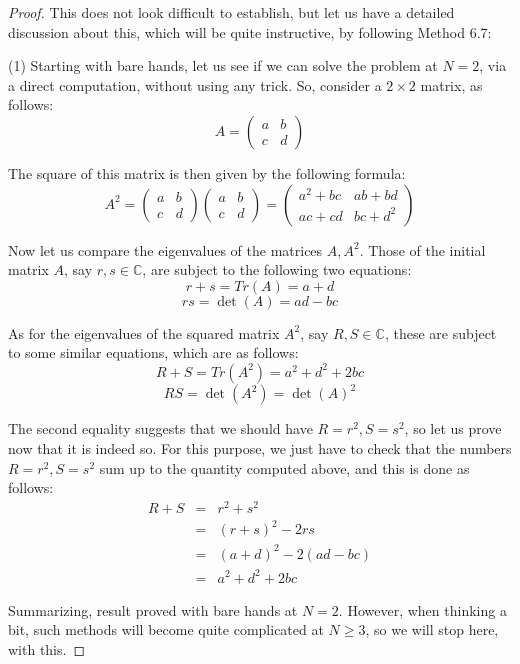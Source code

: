 \documentclass[10pt,a4paper]{amsart}
\begin{document}
\begin{proof}
This does not look difficult to establish, but let us have a detailed discussion about this, which will be quite instructive, by following Method 6.7: 

\medskip

(1) Starting with bare hands, let us see if we can solve the problem at $N=2$, via a direct computation, without using any trick. So, consider a $2\times2$ matrix, as follows:
$$A=\begin{pmatrix}
a&b\\ 
c&d
\end{pmatrix}$$

The square of this matrix is then given by the following formula:
$$A^2=\begin{pmatrix}
a&b\\ 
c&d
\end{pmatrix}\begin{pmatrix}
a&b\\ 
c&d
\end{pmatrix}
=\begin{pmatrix}
a^2+bc&ab+bd\\ 
ac+cd&bc+d^2
\end{pmatrix}$$

Now let us compare the eigenvalues of the matrices $A,A^2$. Those of the initial matrix $A$, say $r,s\in\mathbb C$, are subject to the following two equations:
$$r+s=Tr(A)=a+d$$
$$rs=\det(A)=ad-bc$$

As for the eigenvalues of the squared matrix $A^2$, say $R,S\in\mathbb C$, these are subject to some similar equations, which are as follows:
$$R+S=Tr(A^2)=a^2+d^2+2bc$$
$$RS=\det(A^2)=\det(A)^2$$

The second equality suggests that we should have $R=r^2,S=s^2$, so let us prove now that it is indeed so. For this purpose, we just have to check that the numbers $R=r^2,S=s^2$ sum up to the quantity computed above, and this is done as follows:
\begin{eqnarray*}
R+S
&=&r^2+s^2\\
&=&(r+s)^2-2rs\\
&=&(a+d)^2-2(ad-bc)\\
&=&a^2+d^2+2bc
\end{eqnarray*}

Summarizing, result proved with bare hands at $N=2$. However, when thinking a bit, such methods will become quite complicated at $N\geq3$, so we will stop here, with this.

\medskip


\end{proof}
\end{document}

